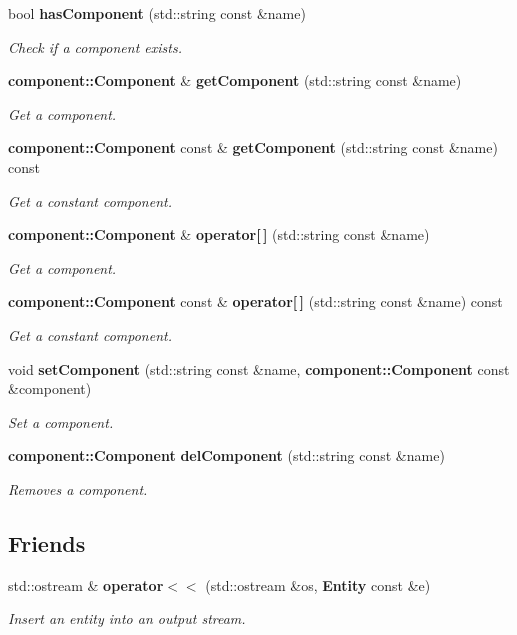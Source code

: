 \begin{DoxyCompactItemize}
bool {\bf has\+Component} (std\+::string const \&name)
\begin{DoxyCompactList}\small\item\em Check if a component exists. \end{DoxyCompactList}\item 
{\bf component\+::\+Component} \& {\bf get\+Component} (std\+::string const \&name)
\begin{DoxyCompactList}\small\item\em Get a component. \end{DoxyCompactList}\item 
{\bf component\+::\+Component} const  \& {\bf get\+Component} (std\+::string const \&name) const
\begin{DoxyCompactList}\small\item\em Get a constant component. \end{DoxyCompactList}\item 
{\bf component\+::\+Component} \& {\bf operator[$\,$]} (std\+::string const \&name)
\begin{DoxyCompactList}\small\item\em Get a component. \end{DoxyCompactList}\item 
{\bf component\+::\+Component} const  \& {\bf operator[$\,$]} (std\+::string const \&name) const
\begin{DoxyCompactList}\small\item\em Get a constant component. \end{DoxyCompactList}\item 
void {\bf set\+Component} (std\+::string const \&name, {\bf component\+::\+Component} const \&component)
\begin{DoxyCompactList}\small\item\em Set a component. \end{DoxyCompactList}\item 
{\bf component\+::\+Component} {\bf del\+Component} (std\+::string const \&name)
\begin{DoxyCompactList}\small\item\em Removes a component. \end{DoxyCompactList}\end{DoxyCompactItemize}
\subsection*{Friends}
\begin{DoxyCompactItemize}
\item 
std\+::ostream \& {\bf operator$<$$<$} (std\+::ostream \&os, {\bf Entity} const \&e)
\begin{DoxyCompactList}\small\item\em Insert an entity into an output stream. \end{DoxyCompactList}\end{DoxyCompactItemize}



